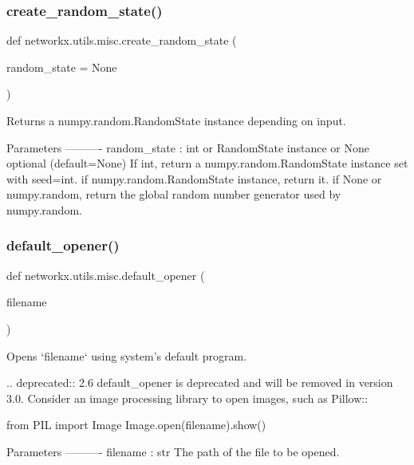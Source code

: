 \subsubsection{\texorpdfstring{create\+\_\+random\+\_\+state()}{create\_random\_state()}}
{\footnotesize\ttfamily def networkx.\+utils.\+misc.\+create\+\_\+random\+\_\+state (\begin{DoxyParamCaption}\item[{}]{random\+\_\+state = {\ttfamily None} }\end{DoxyParamCaption})}

\begin{DoxyVerb}Returns a numpy.random.RandomState instance depending on input.

Parameters
----------
random_state : int or RandomState instance or None  optional (default=None)
    If int, return a numpy.random.RandomState instance set with seed=int.
    if numpy.random.RandomState instance, return it.
    if None or numpy.random, return the global random number generator used
    by numpy.random.
\end{DoxyVerb}
 \mbox{\label{namespacenetworkx_1_1utils_1_1misc_af45a2218b16258dca06f5b68712fb7f3}} 
\subsubsection{\texorpdfstring{default\+\_\+opener()}{default\_opener()}}
{\footnotesize\ttfamily def networkx.\+utils.\+misc.\+default\+\_\+opener (\begin{DoxyParamCaption}\item[{}]{filename }\end{DoxyParamCaption})}

\begin{DoxyVerb}Opens `filename` using system's default program.

.. deprecated:: 2.6
   default_opener is deprecated and will be removed in version 3.0.
   Consider an image processing library to open images, such as Pillow::

       from PIL import Image
       Image.open(filename).show()

Parameters
----------
filename : str
    The path of the file to be opened.\end{DoxyVerb}
 \mbox{\label{namespacenetworkx_1_1utils_1_1misc_af6556592b73c85d84580e76bc08ea7af}} 
